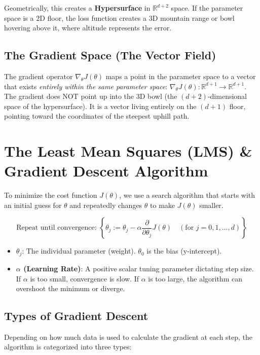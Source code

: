 \documentclass[12pt, a4paper]{report}
\begin{document}
Geometrically, this creates a \textbf{Hypersurface} in $\mathbb{R}^{d+2}$ space. If the parameter space is a 2D floor, the loss function creates a 3D mountain range or bowl hovering above it, where altitude represents the error. 

\subsection{The Gradient Space (The Vector Field)}

The gradient operator $\nabla_\theta J(\theta)$ maps a point in the parameter space to a vector that exists \textit{entirely within the same parameter space}: $\nabla_\theta J(\theta): \mathbb{R}^{d+1} \to \mathbb{R}^{d+1}$. The gradient does NOT point up into the 3D bowl (the $(d+2)$-dimensional space of the hypersurface). It is a vector living entirely on the $(d+1)$ floor, pointing toward the coordinates of the steepest uphill path.

\section{The Least Mean Squares (LMS) \& Gradient Descent Algorithm}

To minimize the cost function $J(\theta)$, we use a search algorithm that starts with an initial guess for $\theta$ and repeatedly changes $\theta$ to make $J(\theta)$ smaller.

\[ \text{Repeat until convergence: } \left\{ \theta_j := \theta_j - \alpha \frac{\partial}{\partial \theta_j} J(\theta) \quad (\text{for } j = 0, 1, \dots, d) \right\} \]

\begin{itemize}
    \item \textbf{$\theta_j$}: The individual parameter (weight). $\theta_0$ is the bias (y-intercept).
    \item \textbf{$\alpha$ (Learning Rate)}: A positive scalar tuning parameter dictating step size. If $\alpha$ is too small, convergence is slow. If $\alpha$ is too large, the algorithm can overshoot the minimum or diverge.
\end{itemize}

\subsection{Types of Gradient Descent}

Depending on how much data is used to calculate the gradient at each step, the algorithm is categorized into three types:
\end{document}
